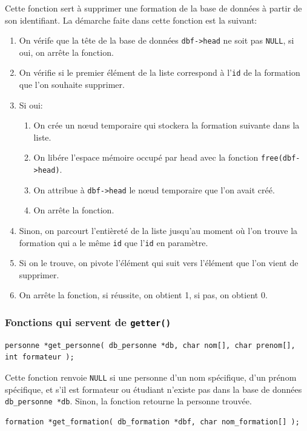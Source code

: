 \documentclass[11pt]{article}
\begin{document}
Cette fonction sert à supprimer une formation de la base de données à partir de son identifiant. La démarche faite dans cette fonction est la suivant:
\begin{enumerate}
\item On vérife que la tête de la base de données \texttt{dbf->head} ne soit pas \texttt{NULL}, si oui, on arrête la fonction.
\item On vérifie si le premier élément de la liste correspond à l'\texttt{id} de la formation que l'on souhaite supprimer.
\item Si oui:
  \begin{enumerate}
  \item On crée un n\oe{}ud temporaire qui stockera la formation suivante dans la liste.
  \item On libére l'espace mémoire occupé par head avec la fonction \texttt{free(dbf->head)}.
  \item On attribue à \texttt{dbf->head} le n\oe{}ud temporaire que l'on avait créé.
  \item On arrête la fonction.
  \end{enumerate}
\item Sinon, on parcourt l'entièreté de la liste jusqu'au moment où l'on trouve la formation qui a le même \texttt{id} que l'\texttt{id} en paramètre.
\item Si on le trouve, on pivote l'élément qui suit vers l'élément que l'on vient de supprimer.
\item On arrête la fonction, si réussite, on obtient 1, si pas, on obtient 0.
\end{enumerate}

\subsubsection{Fonctions qui servent de \texttt{getter()}}

\begin{lstlisting}[firstnumber=275]
  personne *get_personne( db_personne *db, char nom[], char prenom[], int formateur );
\end{lstlisting}

Cette fonction renvoie \texttt{NULL} si une personne d'un nom spécifique, d'un prénom spécifique, et s'il est formateur ou étudiant n'existe pas dans la base de données \texttt{db\_personne *db}. Sinon, la fonction retourne la personne trouvée.

\begin{lstlisting}[firstnumber=532]
  formation *get_formation( db_formation *dbf, char nom_formation[] );
\end{lstlisting}
\end{document}
